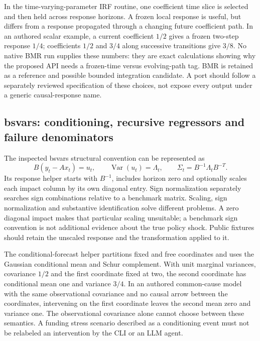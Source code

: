 In the time-varying-parameter IRF routine, one coefficient time slice is selected and then held across response horizons. A frozen local response is useful, but differs from a response propagated through a changing future coefficient path. In an authored scalar example, a current coefficient $1/2$ gives a frozen two-step response $1/4$; coefficients $1/2$ and $3/4$ along successive transitions give $3/8$. No native BMR run supplies these numbers: they are exact calculations showing why the proposed API needs a frozen-time versus evolving-path tag. BMR is retained as a reference and possible bounded integration candidate. A port should follow a separately reviewed specification of these choices, not expose every output under a generic causal-response name.~\citep{exec25_cdyn_bmr,exec25_cdyn_choice}

\subsection{bsvars: conditioning, recursive regressors and failure denominators}

The inspected bsvars structural convention can be represented as
\[
 B\left(y_t-Ax_t\right)=u_t,\qquad
 \operatorname{Var}(u_t)=\Lambda_t,
 \qquad \Sigma_t=B^{-1}\Lambda_tB^{-T}.
\]
Its response helper starts with $B^{-1}$, includes horizon zero and optionally scales each impact column by its own diagonal entry. Sign normalization separately searches sign combinations relative to a benchmark matrix. Scaling, sign normalization and substantive identification solve different problems. A zero diagonal impact makes that particular scaling unsuitable; a benchmark sign convention is not additional evidence about the true policy shock. Public fixtures should retain the unscaled response and the transformation applied to it.~\citep{exec25_cdyn_bsvars}

The conditional-forecast helper partitions fixed and free coordinates and uses the Gaussian conditional mean and Schur complement. With unit marginal variances, covariance $1/2$ and the first coordinate fixed at two, the second coordinate has conditional mean one and variance $3/4$. In an authored common-cause model with the same observational covariance and no causal arrow between the coordinates, intervening on the first coordinate leaves the second mean zero and variance one. The observational covariance alone cannot choose between these semantics. A funding stress scenario described as a conditioning event must not be relabeled an intervention by the CLI or an LLM agent.~\citep{exec25_cdyn_bsvars,exec25_cdyn_choice}

